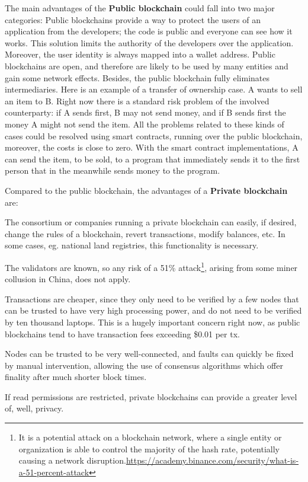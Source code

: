 \begin{outline}[enumerate]
    \1 The main advantages of the \textbf{Public blockchain} could fall into two major categories:
    \2 Public blockchains provide a way to protect the users of an application from the developers; 
    the code is public and everyone can see how it works. This solution limits the authority 
    of the developers over the application. Moreover, the user identity is always mapped into a wallet address.   
    \2 Public blockchains are open, and therefore are likely to be used by many entities and gain 
    some network effects. Besides, the public blockchain fully eliminates intermediaries. Here is an example 
    of a transfer of ownership case. A wants to sell an item to B. Right now there is a standard risk 
    problem of the involved counterparty: if A sends first, B may not send money, and if B sends first the 
    money A might not send the item. All the problems related to these kinds of cases could be resolved using 
    smart contracts, running over the public blockchain, moreover, the costs is close to zero. 
    With the smart contract implementations, A can send the item, to be sold, to a program that immediately 
    sends it to the first person that in the meanwhile sends money to the program. 
    
    \1 Compared to the public blockchain, the advantages of a \textbf{Private blockchain} are:

    \2 The consortium or companies running a private blockchain can easily, if desired, change the rules 
    of a blockchain, revert transactions, modify balances, etc. In some cases, eg. national land 
    registries, this functionality is necessary.
    
    \2 The validators are known, so any risk of a 51\% attack\footnote{ It is a potential attack on a blockchain network, where a single entity or organization is able to control the majority of the hash rate, potentially causing a network disruption.\url{https://academy.binance.com/security/what-is-a-51-percent-attack}}, arising from some miner collusion in China, 
    does not apply.

    \2 Transactions are cheaper, since they only need to be verified by a few nodes that can be trusted 
    to have very high processing power, and do not need to be verified by ten thousand laptops. This is 
    a hugely important concern right now, as public blockchains tend to have transaction fees exceeding 
    \$0.01 per tx.

    \2 Nodes can be trusted to be very well-connected, and faults can quickly be fixed by manual intervention, 
    allowing the use of consensus algorithms which offer finality after much shorter block times. 

    \2 If read permissions are restricted, private blockchains can provide a greater level of, well, privacy.
\end{outline}

